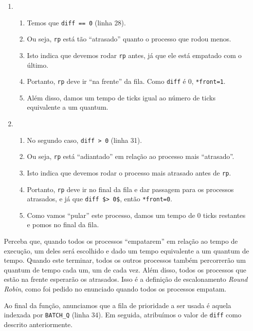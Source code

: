 \documentclass{amsart}
\theoremstyle{plain}
\newcommand{\code}[1]{\lstinline[mathescape=true]{#1}}
\newcommand{\mcode}[1]{\lstinline[mathescape]!#1!}
\begin{document}
\begin{enumerate}[label*=\arabic*o.~subcaso]
  \item~\\
    \begin{enumerate}[label=1.\arabic*.]
      \item Temos que \code{diff == 0} (linha 28).
      \item Ou seja, \code{rp} está tão ``atrasado'' quanto o processo que rodou menos.
      \item Isto indica que devemos rodar \code{rp} antes, já que ele está empatado com o último.
      \item Portanto, \code{rp} deve ir ``na frente'' da fila. Como \code{diff} é 0, \code{*front=1}.
      \item Além disso, damos um tempo de ticks igual ao número de ticks equivalente a um quantum.
    \end{enumerate}
  \item~\\
  \begin{enumerate}[label=2.\arabic*.]
    \item No segundo caso, \code{diff > 0} (linha 31).
    \item Ou seja, \code{rp} está ``adiantado'' em relação ao processo mais ``atrasado''.
    \item Isto indica que devemos rodar o processo mais atrasado antes de \code{rp}.
    \item Portanto, \code{rp} deve ir no final da fila e dar passagem para os processos atrasados,
      e já que \mcode{diff $> 0$}, então \code{*front=0}.
    \item Como vamos ``pular'' este processo, damos um tempo de 0 ticks restantes e pomos no final
      da fila.
  \end{enumerate}
\end{enumerate}

Perceba que, quando todos os processos ``empatarem'' em relação ao tempo de execução, um deles será
escolhido e dado um tempo equivalente a um quantum de tempo. Quando este terminar, todos os outros
processos também percorrerão um quantum de tempo cada um, um de cada vez. Além disso, todos os
processos que estão na frente esperarão os atrasados. Isso é a definição de escalonamento
\textit{Round Robin}, como foi pedido no enunciado quando todos os processos empatam.

Ao final da função, anunciamos que a fila de prioridade a ser usada é aquela indexada por
\code{BATCH_Q} (linha 34). Em seguida, atribuímos o valor de \code{diff} como descrito
anteriormente.
\end{document}
